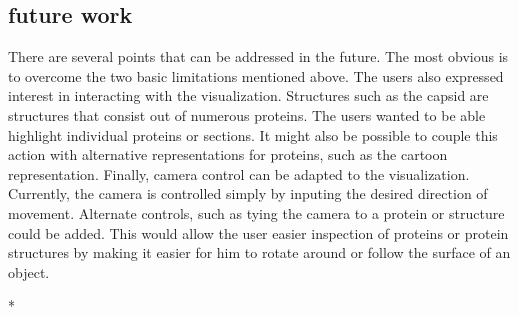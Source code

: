 \documentclass[review,journal]{vgtc}         %
\begin{document}
\subsection{future work}
There are several points that can be addressed in the future. The most obvious is to overcome the two basic limitations mentioned above. 
The users also expressed interest in interacting with the visualization. 
Structures such as the capsid are structures that consist out of numerous proteins. 
The users wanted to be able highlight individual proteins or sections. 
It might also be possible to couple this action with alternative representations for proteins, such as the cartoon representation.
Finally, camera control can be adapted to the visualization. 
Currently, the camera is controlled simply by inputing the desired direction of movement. 
Alternate controls, such as tying the camera to a protein or structure could be added.
This would allow the user easier inspection of proteins or protein structures by making it easier for him to rotate around or follow the surface of an object.





{*}

\end{document}

